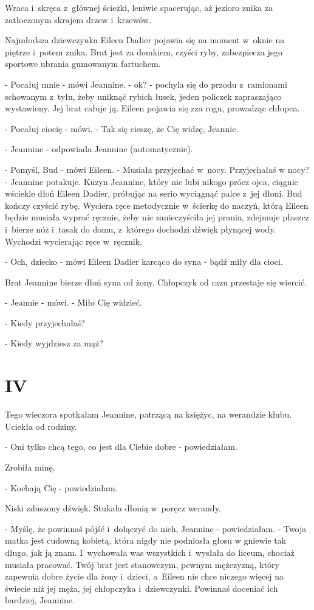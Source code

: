 \documentclass[oneside,polish,12pt,sfheadings]{mwbk}
\begin{document}
Wraca i~skręca z~głównej ścieżki, leniwie spacerując, aż jezioro znika
za zatłoczonym skrajem drzew i~krzewów.

Najmłodsza dziewczynka Eileen Dadier pojawia się na moment w~oknie
na piętrze i~potem znika. Brat jest za domkiem, czyści ryby, zabezpiecza
jego sportowe ubrania gumowanym fartuchem.

- Pocałuj mnie - mówi Jeannine. - ok? - pochyla się do przodu z~ramionami
schowanym z~tyłu, żeby uniknąć rybich łusek, jeden policzek zapraszająco
wystawiony. Jej brat całuje ją. Eileen pojawia się zza rogu, prowadząc
chłopca.

- Pocałuj ciocię - mówi. - Tak się cieszę, że Cię widzę, Jeannie.

- Jeannine - odpowiada Jeannine (automatycznie).

- Pomyśl, Bud - mówi Eileen. - Musiała przyjechać w~nocy. Przyjechałaś
w nocy? - Jeannine potakuje. Kuzyn Jeannine, który nie lubi nikogo
prócz ojca, ciągnie wściekle dłoń Eileen Dadier, próbując na serio
wyciągnąć palce z~jej dłoni. Bud kończy czyścić rybę. Wyciera ręce
metodycznie w~ścierkę do naczyń, którą Eileen będzie musiała wyprać
ręcznie, żeby nie zanieczyściła jej prania, zdejmuje płaszcz i~bierze
nóż i~tasak do domu, z~którego dochodzi dźwięk płynącej wody. Wychodzi
wycierając ręce w~ręcznik. 

- Och, dziecko - mówi Eileen Dadier karcąco
do syna - bądź miły dla cioci.

Brat Jeannine bierze dłoń syna od żony. Chłopczyk od razu przestaje
się wiercić.

- Jeannie - mówi. - Miło Cię widzieć.

- Kiedy przyjechałaś?

- Kiedy wyjdziesz za mąż?

\chapter{IV}

Tego wieczora spotkałam Jeannine, patrzącą na księżyc, na werandzie
klubu. Uciekła od rodziny.

- Oni tylko chcą tego, co jest dla Ciebie dobre - powiedziałam.

Zrobiła minę.

- Kochają Cię - powiedziałam.

Niski zduszony dźwięk. Stukała dłonią w~poręcz werandy.

- Myślę, że powinnaś pójść i~dołączyć do nich, Jeannine - powiedziałam.
- Twoja matka jest cudowną kobietą, która nigdy nie podniosła głosu
w gniewie tak długo, jak ją znam. I~wychowała was wszystkich i~wysłała
do liceum, chociaż musiała pracować. Twój brat jest stanowczym, pewnym
mężczyzną, który zapewnia dobre życie dla żony i~dzieci, a~Eileen
nie chce niczego więcej na świecie niż jej męża, jej chłopczyka i~dziewczynki. Powinnaś doceniać ich bardziej, Jeannine.
\end{document}
